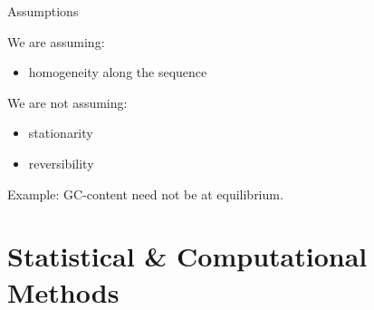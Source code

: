 \documentclass[smaller]{beamer}
\begin{document}
\begin{frame}{Assumptions}

  We are assuming:
  \begin{itemize}

    \item homogeneity along the sequence

  \end{itemize}

  \vspace{2em}

  We are not assuming:
  \begin{itemize}

    \item stationarity

    \item reversibility

  \end{itemize}

  \vspace{2em}

  Example: GC-content need not be at equilibrium.

\end{frame}


\section{Statistical \& Computational Methods}
\end{document}
